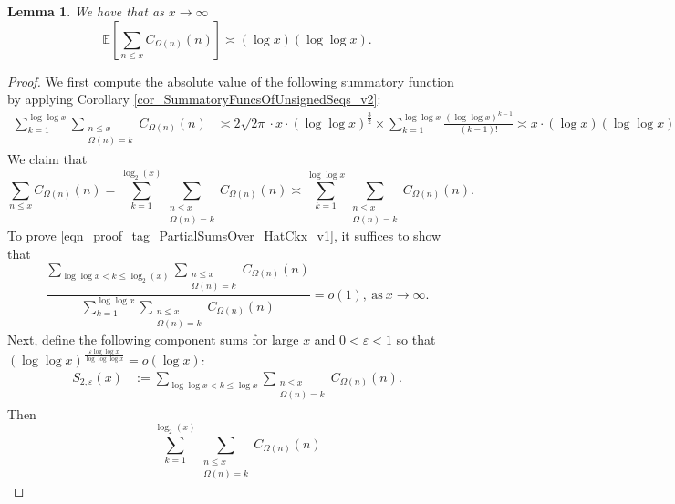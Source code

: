 \documentclass[11pt,reqno,a4letter]{article}
\numberwithin{figure}{section}
\numberwithin{table}{section}
\theoremstyle{plain}
\newtheorem{lemma}[theorem]{Lemma}
\numberwithin{theorem}{section}
\theoremstyle{definition}
\begin{document}
\begin{lemma} 
\label{lemma_HatCAstxSum_ExactFormulaWithError_v1} 
We have that as $x \rightarrow \infty$ 
\[
\mathbb{E}\left[\sum_{n \leq x} C_{\Omega(n)}(n)\right] \asymp (\log x) (\log\log x). 
\] 
\end{lemma} 
\begin{proof} 
We first compute the absolute value of the following 
summatory function by applying 
Corollary \ref{cor_SummatoryFuncsOfUnsignedSeqs_v2}:
\begin{align} 
\label{eqn_proof_tag_PartialSumsOver_HatCkx_v3} 
\sum_{k=1}^{\log\log x} \sum_{\substack{n \leq x \\ \Omega(n) = k}} C_{\Omega(n)}(n) & \asymp 
     2\sqrt{2\pi} \cdot x \cdot (\log\log x)^{\frac{3}{2}} \times \sum_{k=1}^{\log\log x} 
     \frac{(\log\log x)^{k-1}}{(k-1)!} 
     \asymp x \cdot (\log x) (\log\log x). 
\end{align} 
We claim that 
\begin{equation} 
\label{eqn_proof_tag_PartialSumsOver_HatCkx_v1} 
\sum_{n \leq x} C_{\Omega(n)}(n) = 
     \sum_{k=1}^{\log_2(x)} \sum_{\substack{n \leq x \\ \Omega(n) = k}} C_{\Omega(n)}(n) \asymp 
     \sum_{k=1}^{\log\log x} \sum_{\substack{n \leq x \\ \Omega(n) = k}} C_{\Omega(n)}(n). 
\end{equation} 
To prove \eqref{eqn_proof_tag_PartialSumsOver_HatCkx_v1}, it suffices to show that 
\begin{equation} 
\label{eqn_proof_tag_PartialSumsOver_HatCkx_EquivCond_v2} 
\frac{\sum\limits_{\log\log x < k \leq \log_2(x)} \sum\limits_{\substack{n \leq x \\ \Omega(n) = k}} C_{\Omega(n)}(n)}{ 
     \sum\limits_{k=1}^{\log\log x} \sum\limits_{\substack{n \leq x \\ \Omega(n) = k}} C_{\Omega(n)}(n)} = o(1), 
     \mathrm{\ as\ } x \rightarrow \infty. 
\end{equation} 
Next, define the following component sums for large $x$ and $0 < \varepsilon < 1$ so that 
$(\log\log x)^{\frac{\varepsilon \log\log x}{\log\log\log x}} = o(\log x)$: 
\begin{align*} 
S_{2,\varepsilon}(x) & := \sum_{\log\log x < k \leq \log x} \sum_{\substack{n \leq x \\ \Omega(n) = k}} C_{\Omega(n)}(n). 
\end{align*} 
Then 
\[
\sum_{k=1}^{\log_2(x)} \sum_{\substack{n \leq x \\ \Omega(n) = k}} C_{\Omega(n)}(n) 
\]
\end{proof}
\end{document}
